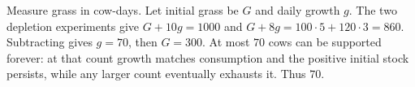 Measure grass in cow-days. Let initial grass be $G$ and daily growth $g$. The two depletion experiments give $G+10g=1000$ and $G+8g=100\cdot5+120\cdot3=860$. Subtracting gives $g=70$, then $G=300$. At most $70$ cows can be supported forever: at that count growth matches consumption and the positive initial stock persists, while any larger count eventually exhausts it. Thus $\boxed{70}$.
